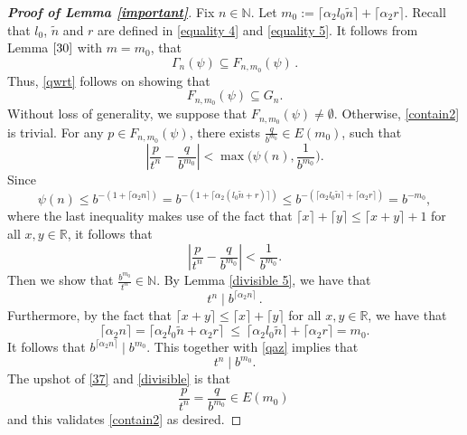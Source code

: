 \documentclass[12pt]{article}
\theoremstyle{definition}
\theoremstyle{remark}
\begin{document}
 \bigskip 
 
\begin{proof}[\rm \textbf{Proof of Lemma \ref{important}}]
Fix $n\in\mathbb{N}$. Let $m_{0}:=\lceil\alpha_{2}l_{0}\tilde{n}\rceil+\lceil\alpha_{2}r\rceil$. Recall that $l_{0}$, $\tilde{n}$ and $r$ are defined in \eqref{equality 4} and 
\eqref{equality 5}. It follows from Lemma $\ref{30}$ with $m=m_{0}$, that
\begin{equation*} 
\Gamma_{n}(\psi)\subseteq F_{n,m_{0}}(\psi) \, . 
\end{equation*}
Thus,   \eqref{qwrt}  follows on showing that 
\begin{equation}\label{contain2}
 F_{n,m_{0}}(\psi)\subseteq G_{n}. 
\end{equation}
Without loss of generality, we suppose that $ F_{n,m_{0}}(\psi)\neq\emptyset$. Otherwise, \eqref{contain2} is trivial. For any $p\in F_{n,m_{0}}(\psi)$, there exists $\frac{q}{b^{m_{0}}}\in E(m_{0})$, such that
$$\left|\frac{p}{t^{n}}-\frac{q}{b^{m_{0}}}\right|<\max\Big(\psi(n),\frac{1}{b^{m_{0}}}\Big).$$
Since
\begin{equation*}
\psi(n)\leq b^{-(1+\lceil\alpha_{2} n\rceil)} =b^{-(1+\lceil\alpha_{2}(l_{0}\tilde{n}+r)\rceil)}\leq b^{-(\lceil\alpha_{2}l_{0}\tilde{n}\rceil+\lceil\alpha_{2}r\rceil)}=b^{-m_{0}},
\end{equation*}
where the last inequality makes use of the  fact that $\lceil x\rceil+\lceil y\rceil\leq\lceil x+y\rceil+1$ for all $x,y\in\mathbb{R}$, it follows that
\begin{equation}\label{37}
\left|\frac{p}{t^{n}}-\frac{q}{b^{m_{0}}}\right|<\frac{1}{b^{m_{0}}}.
\end{equation}
Then we show that $\frac{b^{m_{0}}}{t^{ n}}\in\mathbb{N}$. By Lemma \ref{divisible 5}, we have  that
\begin{equation}\label{qaz} t^{n}\mid b^{\lceil \alpha_{2}n\rceil}  \, .
\end{equation}
Furthermore, by the fact that $\lceil x+y\rceil\leq\lceil x\rceil+\lceil y\rceil$ for all $x,y\in\mathbb{R}$, we have that 
$$\lceil\alpha_{2}n\rceil=\lceil\alpha_{2}l_{0}\tilde{n}+\alpha_{2}r\rceil   \ \leq  \ \lceil\alpha_{2}l_{0}\tilde{n}\rceil+\lceil\alpha_{2}r\rceil=m_{0}.$$
It follows that $b^{\lceil \alpha_{2}n\rceil}\mid b^{m_{0}}$. This together with  
\eqref{qaz}
implies that
\begin{equation}\label{divisible}
t^{n}\mid b^{m_{0}}.
\end{equation}
The upshot of \eqref{37} and \eqref{divisible}  is that
$$\frac{p}{t^{n}}=\frac{q}{b^{m_{0}}}\in E(m_{0})  \,  $$
and this validates \eqref{contain2} as desired. 





\end{proof}
\end{document}
